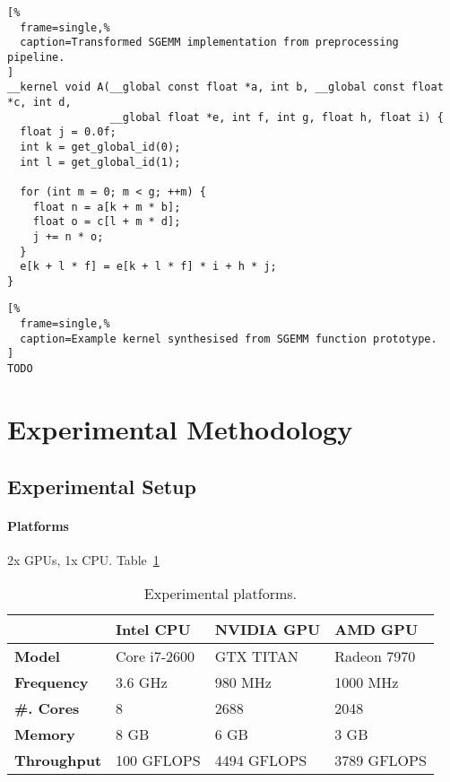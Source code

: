 \documentclass[preprint,nonatbib,10pt,nocopyrightspace]{sigplanconf}
\begin{document}
\lstset{language=[OpenCL]C}
\begin{lstlisting}[%
  frame=single,%
  caption=Transformed SGEMM implementation from preprocessing pipeline.
]
__kernel void A(__global const float *a, int b, __global const float *c, int d,
                __global float *e, int f, int g, float h, float i) {
  float j = 0.0f;
  int k = get_global_id(0);
  int l = get_global_id(1);

  for (int m = 0; m < g; ++m) {
    float n = a[k + m * b];
    float o = c[l + m * d];
    j += n * o;
  }
  e[k + l * f] = e[k + l * f] * i + h * j;
}
\end{lstlisting}


\lstset{language=[OpenCL]C}
\begin{lstlisting}[%
  frame=single,%
  caption=Example kernel synthesised from SGEMM function prototype.
]
TODO
\end{lstlisting}


\section{Experimental Methodology}\label{sec:evaluation}


\subsection{Experimental Setup}\label{subsec:}

\paragraph{Platforms} 2x GPUs, 1x CPU. Table~\ref{tab:platforms}


\begin{table}%
\scriptsize
\centering
\begin{tabular}{l l l l}
  \toprule
  & \textbf{Intel CPU} & \textbf{NVIDIA GPU} & \textbf{AMD GPU} \\
  \midrule
  \textbf{Model} & Core i7-2600 & GTX TITAN & Radeon 7970 \\
  \textbf{Frequency} & 3.6 GHz & 980 MHz & 1000 MHz \\
  \textbf{\#. Cores} & 8 & 2688 & 2048 \\
  \textbf{Memory} & 8 GB & 6 GB & 3 GB \\
  \textbf{Throughput} & 100 GFLOPS & 4494 GFLOPS & 3789 GFLOPS \\
  \bottomrule
\end{tabular}
\caption{Experimental platforms.}
\label{tab:platforms}
\end{table}
\end{document}
